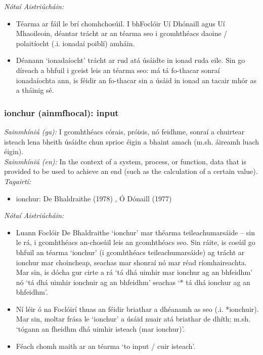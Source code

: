  \noindent \textit{Nótaí Aistriúcháin:}
\begin{itemize}
	\item Téarma ar fáil le brí chomhchosúil. I bhFoclóir Uí Dhónaill agus Uí Mhaoileoin, déantar trácht ar an téarma seo i gcomhthéacs daoine / polaitíocht (.i. ionadaí poiblí) amháin.
	\item Déanann `ionadaíocht' trácht ar rud atá úsáidte in ionad ruda eile. Sin go díreach a bhfuil i gceist leis an téarma seo: má tá fo-thacar sonraí ionadaíochta ann, is féidir an fo-thacar sin a úsáid in ionad an tacair mhór as a tháinig sé.
\end{itemize}


\subsubsection*{ionchur (ainmfhocal): input}
 \noindent \textit{Sainmhíniú (ga):} I gcomhthéacs córais, próisis, nó feidhme, sonraí a chuirtear isteach lena bheith úsáidte chun sprioc éigin a bhaint amach (m.sh. áireamh luach éigin).
\\
 \noindent \textit{Sainmhíniú (en):} In the context of a system, process, or function, data that is provided to be used to achieve an end (such as the calculation of a certain value).
\\
 \noindent \textit{Tagairtí:}
\begin{itemize}
	\item ionchur: De Bhaldraithe (1978) \cite{de-bhaldraithe}, Ó Dónaill (1977) \cite{odonaill}
\end{itemize}

 \noindent \textit{Nótaí Aistriúcháin:}
\begin{itemize}
	\item Luann Foclóir De Bhaldraithe `ionchur' mar théarma teileachumarsáide -- sin le rá, i gcomhthéacs an-chosúil leis an gcomhthéacs seo. Sin ráite, is cosúil go bhfuil an téarma `ionchur' (i gcomhthéacs teileachumarsáide) ag trácht ar ionchur mar choincheap, seachas mar shonraí nó mar réad ríomhaireachta. Mar sin, is dócha gur cirte a rá `tá dhá uimhir mar ionchur ag an bhfeidhm' nó `tá dhá uimhir ionchuir ag an bhfeidhm' seachas `* tá dhá ionchur ag an bhfeidhm'.
	\item Ní léir ó na Foclóirí thuas an féidir briathar a dhéanamh as seo (.i. *ionchuir). Mar sin, moltar frása le `ionchur' a úsáid nuair atá briathar de dhíth; m.sh. `tógann an fheidhm dhá uimhir isteach (mar ionchur)'.
	\item Féach chomh maith ar an téarma `to input / cuir isteach'.
\end{itemize}


